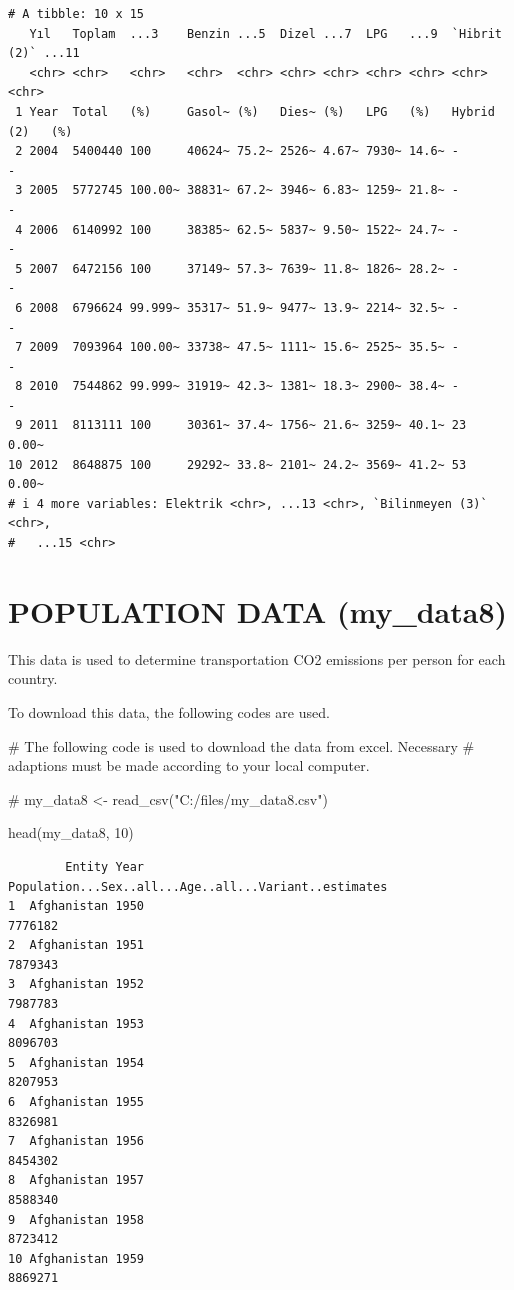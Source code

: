 \documentclass[
  11pt,
  a4paper,
  DIV=11,
  numbers=noendperiod]{scrartcl}
\newenvironment{Shaded}{\begin{snugshade}}{\end{snugshade}}
\newcommand{\CommentTok}[1]{\textcolor[rgb]{0.37,0.37,0.37}{#1}}
\newcommand{\DecValTok}[1]{\textcolor[rgb]{0.68,0.00,0.00}{#1}}
\newcommand{\FunctionTok}[1]{\textcolor[rgb]{0.28,0.35,0.67}{#1}}
\newcommand{\NormalTok}[1]{\textcolor[rgb]{0.00,0.23,0.31}{#1}}
\begin{document}
\begin{verbatim}
# A tibble: 10 x 15
   Yıl   Toplam  ...3    Benzin ...5  Dizel ...7  LPG   ...9  `Hibrit (2)` ...11
   <chr> <chr>   <chr>   <chr>  <chr> <chr> <chr> <chr> <chr> <chr>        <chr>
 1 Year  Total   (%)     Gasol~ (%)   Dies~ (%)   LPG   (%)   Hybrid (2)   (%)  
 2 2004  5400440 100     40624~ 75.2~ 2526~ 4.67~ 7930~ 14.6~ -            -    
 3 2005  5772745 100.00~ 38831~ 67.2~ 3946~ 6.83~ 1259~ 21.8~ -            -    
 4 2006  6140992 100     38385~ 62.5~ 5837~ 9.50~ 1522~ 24.7~ -            -    
 5 2007  6472156 100     37149~ 57.3~ 7639~ 11.8~ 1826~ 28.2~ -            -    
 6 2008  6796624 99.999~ 35317~ 51.9~ 9477~ 13.9~ 2214~ 32.5~ -            -    
 7 2009  7093964 100.00~ 33738~ 47.5~ 1111~ 15.6~ 2525~ 35.5~ -            -    
 8 2010  7544862 99.999~ 31919~ 42.3~ 1381~ 18.3~ 2900~ 38.4~ -            -    
 9 2011  8113111 100     30361~ 37.4~ 1756~ 21.6~ 3259~ 40.1~ 23           0.00~
10 2012  8648875 100     29292~ 33.8~ 2101~ 24.2~ 3569~ 41.2~ 53           0.00~
# i 4 more variables: Elektrik <chr>, ...13 <chr>, `Bilinmeyen (3)` <chr>,
#   ...15 <chr>
\end{verbatim}

\section{POPULATION DATA (my\_data8)}\label{population-data-my_data8}

This data is used to determine transportation CO2 emissions per person
for each country.

To download this data, the following codes are used.

\begin{Shaded}
\begin{Highlighting}[]
\CommentTok{\# The following code is used to download the data from excel. Necessary}
\CommentTok{\# adaptions must be made according to your local computer.}

\CommentTok{\# my\_data8 \textless{}{-} read\_csv("C:/files/my\_data8.csv")}

\FunctionTok{head}\NormalTok{(my\_data8, }\DecValTok{10}\NormalTok{)}
\end{Highlighting}
\end{Shaded}

\begin{verbatim}
        Entity Year Population...Sex..all...Age..all...Variant..estimates
1  Afghanistan 1950                                               7776182
2  Afghanistan 1951                                               7879343
3  Afghanistan 1952                                               7987783
4  Afghanistan 1953                                               8096703
5  Afghanistan 1954                                               8207953
6  Afghanistan 1955                                               8326981
7  Afghanistan 1956                                               8454302
8  Afghanistan 1957                                               8588340
9  Afghanistan 1958                                               8723412
10 Afghanistan 1959                                               8869271
\end{verbatim}
\end{document}
